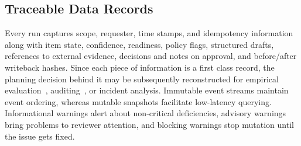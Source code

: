 \documentclass[pdflatex,sn-basic]{sn-jnl}
\begin{document}
\subsection{Traceable Data Records}
Every run captures scope, requester, time stamps, and idempotency information along with item state, confidence, readiness, policy flags, structured drafts, references to external evidence, decisions and notes on approval, and before/after writeback hashes. Since each piece of information is a first class record, the planning decision behind it may be subsequently reconstructed for empirical evaluation~\citep{R70,R54}, auditing~\citep{R93}, or incident analysis. Immutable event streams maintain event ordering, whereas mutable snapshots facilitate low-latency querying. Informational warnings alert about non-critical deficiencies, advisory warnings bring problems to reviewer attention, and blocking warnings stop mutation until the issue gets fixed.
\end{document}
